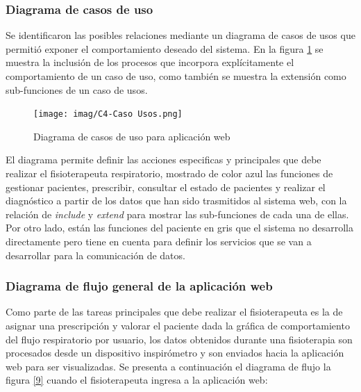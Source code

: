 \documentclass[12pt]{article}
\begin{document}
\newpage

\subsubsection{Diagrama de casos de uso} %

Se identificaron las posibles relaciones mediante un diagrama de casos de usos que permitió exponer el comportamiento deseado del sistema. En la figura \ref{8} se muestra la inclusión de los procesos que incorpora explícitamente el comportamiento de un caso de uso, como también se muestra la extensión como sub-funciones de un caso de usos.


\begin{figure}[ht]
\centering
\texttt{[image: imag/C4-Caso Usos.png]}
\caption{Diagrama de casos de uso para aplicación web }
\label{8}
\end{figure}
\FloatBarrier

El diagrama permite definir las acciones especificas y principales que debe realizar el fisioterapeuta respiratorio, mostrado de color azul las funciones de gestionar pacientes, prescribir, consultar el estado de pacientes y realizar el diagnóstico a partir de los datos que han sido trasmitidos al sistema web, con la relación de \textit{include} y  \textit{extend} para mostrar las sub-funciones de cada una de ellas. Por otro lado, están las funciones del paciente en gris que el sistema no desarrolla directamente pero tiene en cuenta para definir los servicios que se van a desarrollar para la comunicación de datos.


\subsubsection{Diagrama de flujo general de la aplicación web} %

Como parte de las tareas principales que debe realizar el fisioterapeuta es la de asignar una prescripción y valorar el paciente dada la gráfica de comportamiento del flujo respiratorio por usuario, los datos obtenidos durante una fisioterapia son procesados desde un dispositivo inspirómetro y son enviados hacia la aplicación web para ser visualizadas. Se presenta a continuación el diagrama de flujo la figura \ref{9} cuando el fisioterapeuta ingresa a la aplicación web: 
\end{document}
